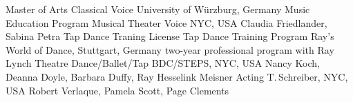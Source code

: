 \begin{cventries}
  \cventrytab
    {Master of Arts}
    {Classical Voice}
    {University of W\"urzburg, Germany}
    {Music Education Program}
 \cventrytab
    {}
    {Musical Theater Voice}
    {NYC, USA}
    {Claudia Friedlander, Sabina Petra}
    \cventrytab
      {Tap Dance Traning License}
      {Tap Dance Training Program}
      {Ray's World of Dance, Stuttgart, Germany}
      {two-year professional program with Ray Lynch}
    \cventrytab
      {}
      {Theatre Dance/Ballet/Tap}
      {BDC/STEPS, NYC, USA}
      {Nancy Koch, Deanna Doyle, Barbara Duffy, Ray Hesselink}
    \cventrytab
      {}
      {Meisner Acting}
      {T.\,Schreiber, NYC, USA}
      {Robert Verlaque, Pamela Scott, Page Clements}
\end{cventries}
